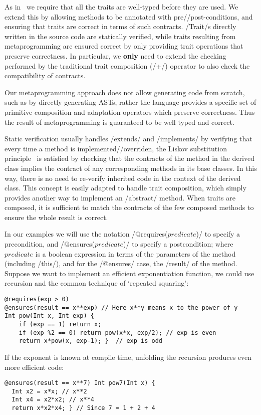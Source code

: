 As in~\cite{servetto2014meta}
we require that all the traits are well-typed
before they are used.
We extend this by allowing
methods to be annotated with pre//post-conditions, and 
ensuring that traits are correct in terms of such contracts.
/Trait/s directly written in the source code are statically verified, while traits resulting from metaprogramming are ensured correct by only providing trait operations that preserve correctness. 
In particular, we \textbf{only} need to extend the checking performed by the traditional trait composition (/+/)  operator to also check the compatibility of contracts.

%
%
Our metaprogramming approach does not allow generating code from scratch, such as by directly generating ASTs, rather the language provides a specific set of primitive composition and adaptation operators which preserve correctness.
Thus the result of metaprogramming is guaranteed to be well typed and correct.


Static verification usually handles /extends/ and /implements/ by verifying that every 
time a method is implemented//overriden, 
the Liskov substitution principle~\cite{Liskov:1994:BNS:197320.197383} is satisfied
by checking that the contracts of the method in the derived class implies the contract of any corresponding methods in its base classes. 
 In this way, there is no need to re-verify
inherited code in the context of the derived class.
This concept is easily adapted
to handle trait composition, which simply provides another way to implement an /abstract/ method.
When traits are composed,
it is sufficient
to match the contracts of the few composed methods
to ensure the whole result is correct.

In our examples we will use the notation /@requires($predicate$)/ 
to specify a precondition, and /@ensures($predicate$)/ 
to specify a postcondition; where $predicate$ is a boolean expression
in terms of the parameters of the method (including /this/), and for the /@ensures/ case, the /result/ of the method.
Suppose we want to implement an efficient exponentiation function, we could use recursion and the common technique of `repeated squaring':
\vspace{-1ex}
\begin{lstlisting}
@requires(exp > 0)
@ensures(result == x**exp) // Here x**y means x to the power of y
Int pow(Int x, Int exp) {
	if (exp == 1) return x;
	if (exp %2 == 0) return pow(x*x, exp/2); // exp is even
	return x*pow(x, exp-1); }  // exp is odd
\end{lstlisting}
If the exponent is known at compile time,
unfolding the recursion produces even more efficient code:
\vspace{-1ex}
\begin{lstlisting}
@ensures(result == x**7) Int pow7(Int x) { 
  Int x2 = x*x; // x**2
  Int x4 = x2*x2; // x**4
  return x*x2*x4; } // Since 7 = 1 + 2 + 4
\end{lstlisting}
\vspace{-1ex}


